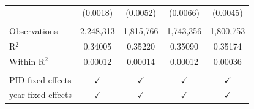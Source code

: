 \begin{tabular}{lcccc}
                      & (0.0018)               & (0.0052)               & (0.0066)       & (0.0045)\\   
    \\
   Observations       & 2,248,313              & 1,815,766              & 1,743,356      & 1,800,753\\  
   R$^2$              & 0.34005                & 0.35220                & 0.35090        & 0.35174\\  
   Within R$^2$       & 0.00012                & 0.00014                & 0.00012        & 0.00036\\  
    \\
   PID fixed effects  & $\checkmark$           & $\checkmark$           & $\checkmark$   & $\checkmark$\\   
   year fixed effects & $\checkmark$           & $\checkmark$           & $\checkmark$   & $\checkmark$\\   
   \bottomrule
\end{tabular}
\par\endgroup


